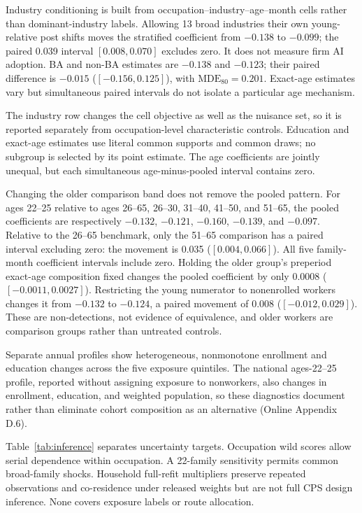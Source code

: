 Industry conditioning is built from occupation--industry--age--month cells rather than dominant-industry labels.  Allowing 13 broad industries their own young-relative post shifts moves the stratified coefficient from $-0.138$ to $-0.099$; the paired 0.039 interval $[0.008,0.070]$ excludes zero.  It does not measure firm AI adoption.  BA and non-BA estimates are $-0.138$ and $-0.123$; their paired difference is $-0.015$ ($[-0.156,0.125]$), with $\mathrm{MDE}_{80}=0.201$.  Exact-age estimates vary but simultaneous paired intervals do not isolate a particular age mechanism.

The industry row changes the cell objective as well as the nuisance set, so it is reported separately from occupation-level characteristic controls.  Education and exact-age estimates use literal common supports and common draws; no subgroup is selected by its point estimate.  The age coefficients are jointly unequal, but each simultaneous age-minus-pooled interval contains zero.

Changing the older comparison band does not remove the pooled pattern.  For ages
22--25 relative to ages 26--65, 26--30, 31--40, 41--50, and 51--65, the pooled
coefficients are respectively $-0.132$, $-0.121$, $-0.160$, $-0.139$, and
$-0.097$.  Relative to the 26--65 benchmark, only the 51--65 comparison has a
paired interval excluding zero: the movement is 0.035
($[0.004,0.066]$).  All five family-month coefficient intervals include zero.
Holding the older group's preperiod exact-age composition fixed changes the
pooled coefficient by only 0.0008 ($[-0.0011,0.0027]$).  Restricting the young
numerator to nonenrolled workers changes it from $-0.132$ to $-0.124$, a paired
movement of 0.008 ($[-0.012,0.029]$).  These are non-detections, not evidence of
equivalence, and older workers are comparison groups rather than untreated
controls.

Separate annual profiles show heterogeneous, nonmonotone enrollment and
education changes across the five exposure quintiles.  The national
ages-22--25 profile, reported without assigning exposure to nonworkers, also
changes in enrollment, education, and weighted population, so these diagnostics
document rather than eliminate cohort composition as an alternative (Online
Appendix D.6).

Table~\ref{tab:inference} separates uncertainty targets.  Occupation wild scores allow serial dependence within occupation.  A 22-family sensitivity permits common broad-family shocks.  Household full-refit multipliers preserve repeated observations and co-residence under released weights but are not full CPS design inference.  None covers exposure labels or route allocation.

